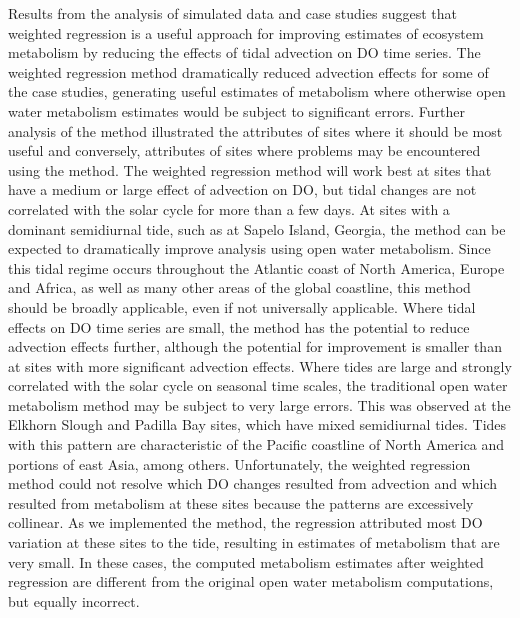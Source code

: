 \documentclass[letterpaper,12pt,oneside]{article}\usepackage[]{graphicx}\usepackage[]{color}
\begin{document}
Results from the analysis of simulated data and case studies suggest that weighted regression is a useful approach for improving estimates of ecosystem metabolism by reducing the effects of tidal advection on \ac{DO} time series.  The weighted regression method dramatically reduced advection effects for some of the case studies, generating useful estimates of metabolism where otherwise open water metabolism estimates would be subject to significant errors.  Further analysis of the method illustrated the attributes of sites where it should be most useful and conversely, attributes of sites where problems may be encountered using the method.  The weighted regression method will work best at sites that have a medium or large effect of advection on \ac{DO}, but tidal changes are not correlated with the solar cycle for more than a few days.  At sites with a dominant semidiurnal tide, such as at Sapelo Island, Georgia, the method can be expected to dramatically improve analysis using open water metabolism.  Since this tidal regime occurs throughout the Atlantic coast of North America, Europe and Africa, as well as many other areas of the global coastline, this method should be broadly applicable, even if not universally applicable.  Where tidal effects on \ac{DO} time series are small, the method has the potential to reduce advection effects further, although the potential for improvement is smaller than at sites with more significant advection effects.  Where tides are large and strongly correlated with the solar cycle on seasonal time scales, the traditional open water metabolism method may be subject to very large errors.  This was observed at the Elkhorn Slough and Padilla Bay sites, which have mixed semidiurnal tides.  Tides with this pattern are characteristic of the Pacific coastline of North America and portions of east Asia, among others.  Unfortunately, the weighted regression method could not resolve which \ac{DO} changes resulted from advection and which resulted from metabolism at these sites because the patterns are excessively collinear.  As we implemented the method, the regression attributed most \ac{DO} variation at these sites to the tide, resulting in estimates of metabolism that are very small.  In these cases, the computed metabolism estimates after weighted regression are different from the original open water metabolism computations, but equally incorrect.
\end{document}
